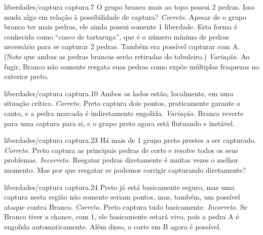 \problemAnswerDiagram
  {liberdades/captura}
  {captura.7}
  {O grupo branco mais ao topo possui 2 pedras. Isso muda algo em relação à possibilidade de captura?}
  {\emph{Correto.} Apesar de o grupo branco ter mais pedras, ele ainda possui somente 1 liberdade. Esta forma é conhecida como ``casco de tartaruga'', que é o número mínimo de pedras necessário para se capturar 2 pedras. Também era possível capturar com A. (Note que ambas as pedras brancas serão retiradas do tabuleiro.)}
  {\emph{Variação.} Ao fugir, Branco não somente resgata suas pedras como expõe múltiplas fraquezas no exterior preto.}

\problemAnswerDiagram
  {liberdades/captura}
  {captura.10}
  {Ambos os lados estão, localmente, em uma situação crítica.}
  {\emph{Correto.} Preto captura dois pontos, praticamente garante o canto, e a pedra marcada é indiretamente engolida.}
  {\emph{Variação.} Branco reverte para uma captura para si, e o grupo preto agora está flutuando e instável.}

\problemAnswerDiagram
  {liberdades/captura}
  {captura.23}
  {Há mais de 1 grupo preto prestes a ser capturado.}
  {\emph{Correto.} Preto captura as principais pedras de corte e resolve todos os seus problemas.}
  {\emph{Incorreto.} Resgatar pedras diretamente é muitas vezes o melhor momento. Mas por que resgatar se podemos corrigir capturando diretamente?}

\problemAnswerDiagram
  {liberdades/captura}
  {captura.24}
  {Preto já está basicamente seguro, mas uma captura nesta região não somente seriam pontos, mas, também, um possível ataque contra Branco.}
  {\emph{Correto.} Preto captura tudo basicamente.}
  {\emph{Incorreto.} Se Branco tiver a chance, com 1, ele basicamente estará vivo, pois a pedra A é engolida automaticamente. Além disso, o corte em B agora é possível.}

\clearedpage
\clearedpage




